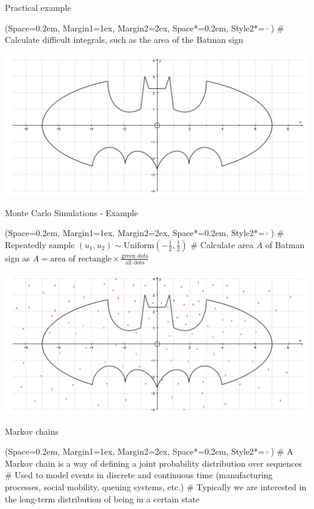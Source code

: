 \documentclass[12pt, aspectratio=149]{beamer}
\newcommand{\listSpace}{0.2em}
\theoremstyle{plain}
\begin{document}
\begin{frame}[fragile]{Practical example}
	\begin{easylist}
		\ListProperties(Space=\listSpace, Margin1=1ex, Margin2=2ex, Space*=\listSpace, Style2*=$\color{bggraydark}\blacktriangleright$\space)
		# Calculate difficult integrals, such as the area of the Batman sign
	\end{easylist}
	\includegraphics[scale=0.3]{figs/bat_signal.png}
\end{frame}

\begin{frame}[fragile]{Monte Carlo Simulations - Example}
	\begin{easylist}
		\ListProperties(Space=\listSpace, Margin1=1ex, Margin2=2ex, Space*=\listSpace, Style2*=$\color{bggraydark}\blacktriangleright$\space)
		# Repeatedly sample $(u_1, u_2) \sim \text{Uniform}(-\frac{1}{2}, \frac{1}{2})$
		# Calculate area $A$ of Batman sign as $A = \textrm{area of rectangle} \times \frac{\textrm{green dots}}{\textrm{all dots}}$
	\end{easylist}
	\includegraphics[scale=0.3]{figs/bat_signal_mcs.png}
\end{frame}


\begin{frame}[fragile]{Markov chains}
	\begin{easylist}
		\ListProperties(Space=\listSpace, Margin1=1ex, Margin2=2ex, Space*=\listSpace, Style2*=$\color{bggraydark}\blacktriangleright$\space)
		# A Markov chain is a way of defining a joint probability distribution over sequences
		# Used to model events in discrete and continuous time (manufacturing processes, social mobility, queuing systems, etc.)
		# Typically we are interested in the long-term distribution of being in a certain state
	\end{easylist}
\end{frame}
\end{document}
